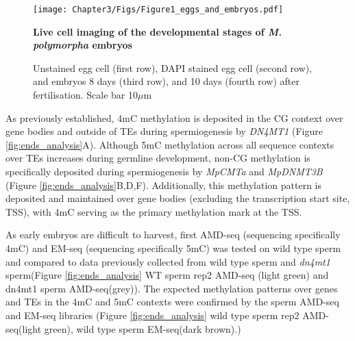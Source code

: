 \begin{figure}[htbp!] 
\centering    
    \texttt{[image: Chapter3/Figs/Figure1\_eggs\_and\_embryos.pdf]}
\caption{\textbf{Live cell imaging of the developmental stages of \textit{M. polymorpha} embryos}}
\label{fig:egg_embryo}
\captionsetup{font=small}
    \caption*{Unstained egg cell (first row), DAPI stained egg cell (second row), and embryos 8 days (third row), and 10 days (fourth row) after fertilisation. Scale bar 10$\mu$m}
\end{figure}

As previously established, 4mC methylation is deposited in the CG context over gene bodies and outside of TEs during spermiogenesis by \textit{DN4MT1} (Figure \ref{fig:ends_analysis}A)\cite{RN189}. Although 5mC methylation across all sequence contexts over TEs increases during germline development, non-CG methylation is specifically deposited during spermiogenesis by \textit{MpCMTa} and \textit{MpDNMT3B} (Figure \ref{fig:ends_analysis}B,D,F)\cite{RN189}.  Additionally, this methylation pattern is deposited and maintained over gene bodies (excluding the transcription start site, TSS), with 4mC serving as the primary methylation mark at the TSS. 

As early embryos are difficult to harvest, first AMD-seq (sequencing specifically 4mC) and EM-seq (sequencing specifically 5mC) was tested on wild type sperm and compared to data previously collected from wild type sperm and \textit{dn4mt1} sperm(Figure \ref{fig:ends_analysis} WT sperm rep2 AMD-seq (light green) and dn4mt1 sperm AMD-seq(grey)). The expected methylation patterns over genes and TEs in the 4mC and 5mC contexts were confirmed by the sperm AMD-seq and EM-seq libraries (Figure \ref{fig:ends_analysis} wild type sperm rep2 AMD-seq(light green), wild type sperm EM-seq(dark brown).) 


